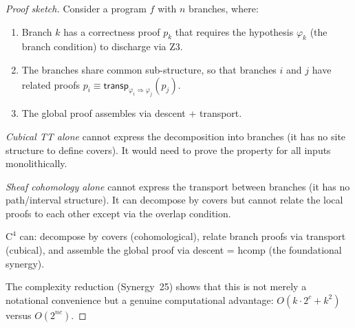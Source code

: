 \documentclass[11pt,a4paper]{article}
\theoremstyle{definition}
\theoremstyle{plain}
\newcommand{\transp}{\mathsf{transp}}
\begin{document}
\begin{proof}[Proof sketch]
Consider a program $f$ with $n$ branches, where:
\begin{enumerate}
\item Branch $k$ has a correctness proof $p_k$ that requires the
  hypothesis $\varphi_k$ (the branch condition) to discharge via Z3.
\item The branches share common sub-structure, so that branches
  $i$ and $j$ have related proofs $p_i \equiv \transp_{\varphi_i
  \Rightarrow \varphi_j}(p_j)$.
\item The global proof assembles via descent + transport.
\end{enumerate}

\emph{Cubical TT alone} cannot express the decomposition into
branches (it has no site structure to define covers).  It would
need to prove the property for all inputs monolithically.

\emph{Sheaf cohomology alone} cannot express the transport
between branches (it has no path/interval structure).  It can
decompose by covers but cannot relate the local proofs to each
other except via the overlap condition.

$\mathrm{C}^4$ can: decompose by covers (cohomological), relate
branch proofs via transport (cubical), and assemble the global
proof via descent = hcomp (the foundational synergy).

The complexity reduction (Synergy~25) shows that this is not
merely a notational convenience but a genuine computational
advantage: $O(k \cdot 2^c + k^2)$ versus $O(2^{nc})$.
\end{proof}
\end{document}
